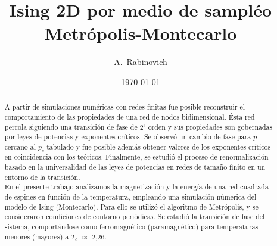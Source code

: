 \documentclass[%
 reprint,
 amsmath,amssymb,
 aps,
spanish]{revtex4-1}
\begin{document}

\title{Ising 2D por medio de sampléo Metrópolis-Montecarlo}%

\author{A.~Rabinovich}
%


\date{\today}%

\begin{abstract}
A partir de simulaciones numéricas con redes finitas fue posible reconstruir el comportamiento de las propiedades de una red de nodos bidimensional. Ésta red percola siguiendo una transición de fase de $2^\circ$ orden y sus propiedades son gobernadas por leyes de potencias y exponentes críticos. Se observó un cambio de fase para $p$ cercano al $p_c$ tabulado y fue posible además obtener valores de los exponentes críticos en coincidencia con los teóricos. Finalmente, se estudió el proceso de renormalización basado en la universalidad de las leyes de potencias en redes de tamaño finito en un entorno de la transición.\\

En el presente trabajo analizamos la magnetización y la energía de una red cuadrada de espines en función
de la temperatura, empleando una simulación númerica del modelo de Ising (Montecarlo). Para ello se utilizó el
algoritmo de Metrópolis, y se consideraron condiciones de contorno periódicas. Se estudió la transición de fase del
sistema, comportándose como ferromagnético (paramagnético) para temperaturas menores (mayores) a $T_c$ $\approx$ 2,26.
\end{abstract}


\maketitle

\end{document}
